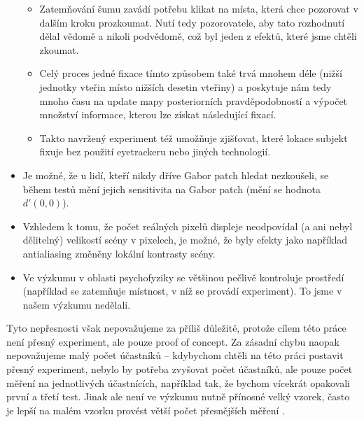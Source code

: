\begin{itemize}
\begin{itemize}
\item Zatemňování šumu zavádí potřebu klikat na místa, která chce pozorovat v
dalším kroku prozkoumat. Nutí tedy pozorovatele, aby tato rozhodnutí dělal
vědomě a nikoli podvědomě, což byl jeden z efektů, které jsme chtěli zkoumat.

\item Celý proces jedné fixace tímto způsobem také trvá mnohem déle (nižší
jednotky vteřin místo nižších desetin vteřiny) a poskytuje nám tedy mnoho času
na update mapy posteriorních pravděpodobností a výpočet množství informace,
kterou lze získat následující fixací.

\item Takto navržený experiment též umožňuje zjišťovat, které lokace subjekt
fixuje bez použití eyetrackeru nebo jiných technologií.

\end{itemize}

\item Je možné, že u lidí, kteří nikdy dříve Gabor patch hledat nezkoušeli, se
během testů mění jejich sensitivita na Gabor patch (mění se hodnota $d'(0,0)$).

\item Vzhledem k tomu, že počet reálných pixelů displeje neodpovídal (a ani
nebyl dělitelný) velikostí scény v pixelech, je možné, že byly efekty jako
například antialiasing změněny lokální kontrasty scény.

\item Ve výzkumu v oblasti psychofyziky se většinou
pečlivě kontroluje prostředí (například se zatemňuje místnost, v níž se provádí experiment). To jsme v našem výzkumu nedělali.

\end{itemize}

Tyto nepřesnosti však nepovažujeme za příliš důležité, protože cílem této práce
není přesný experiment, ale pouze proof of concept. Za zásadní chybu naopak
nepovažujeme malý počet účastníků -- kdybychom chtěli na této práci postavit
přesný experiment, nebylo by potřeba zvyšovat počet účastníků, ale pouze počet
měření na jednotlivých účastnících, například tak, že bychom vícekrát opakovali
první a třetí test. Jinak ale není ve výzkumu nutně přínosné velký vzorek,
často je lepší na malém vzorku provést větší počet přesnějších měření
\citep{SmallN}.

